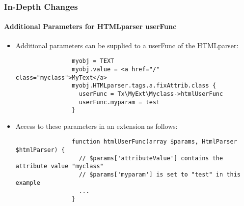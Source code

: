 \begin{frame}[fragile]
	\frametitle{In-Depth Changes}
	\framesubtitle{Additional Parameters for HTMLparser userFunc}

	\lstset{basicstyle=\tiny\ttfamily}

	\begin{itemize}

		\item Additional parameters can be supplied to a userFunc of the HTMLparser:

			\begin{lstlisting}
				myobj = TEXT
				myobj.value = <a href="/" class="myclass">MyText</a>
				myobj.HTMLparser.tags.a.fixAttrib.class {
				  userFunc = Tx\MyExt\Myclass->htmlUserFunc
				  userFunc.myparam = test
				}
			\end{lstlisting}

		\item Access to these parameters in an extension as follows:

			\begin{lstlisting}
				function htmlUserFunc(array $params, HtmlParser $htmlParser) {
				  // $params['attributeValue'] contains the attribute value "myclass"
				  // $params['myparam'] is set to "test" in this example
				  ...
				}
			\end{lstlisting}

	\end{itemize}

\end{frame}

